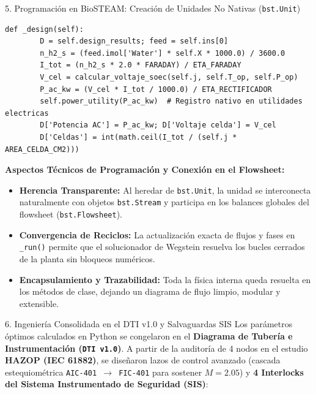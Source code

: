 \documentclass[12pt]{article}
\begin{document}
\begin{minipage}[t]{0.49\linewidth}
\begin{posterbox}[secondaryblue]{5. Programación en BioSTEAM: Creación de Unidades No Nativas (\texttt{bst.Unit})}
\begin{lstlisting}[style=biosteamcode]
    def _design(self):
        D = self.design_results; feed = self.ins[0]
        n_h2_s = (feed.imol['Water'] * self.X * 1000.0) / 3600.0
        I_tot = (n_h2_s * 2.0 * FARADAY) / ETA_FARADAY
        V_cel = calcular_voltaje_soec(self.j, self.T_op, self.P_op)
        P_ac_kw = (V_cel * I_tot / 1000.0) / ETA_RECTIFICADOR
        self.power_utility(P_ac_kw)  # Registro nativo en utilidades electricas
        D['Potencia AC'] = P_ac_kw; D['Voltaje celda'] = V_cel
        D['Celdas'] = int(math.ceil(I_tot / (self.j * AREA_CELDA_CM2)))
\end{lstlisting}

        \vspace{6pt}
        \textbf{Aspectos Técnicos de Programación y Conexión en el Flowsheet:}
        \begin{itemize}[leftmargin=*, itemsep=2.5pt, topsep=2pt]
            \item \textbf{Herencia Transparente:} Al heredar de \texttt{bst.Unit}, la unidad se interconecta naturalmente con objetos \texttt{bst.Stream} y participa en los balances globales del flowsheet (\texttt{bst.Flowsheet}).
            \item \textbf{Convergencia de Reciclos:} La actualización exacta de flujos y fases en \texttt{\_run()} permite que el solucionador de Wegstein resuelva los bucles cerrados de la planta sin bloqueos numéricos.
            \item \textbf{Encapsulamiento y Trazabilidad:} Toda la física interna queda resuelta en los métodos de clase, dejando un diagrama de flujo limpio, modular y extensible.
        \end{itemize}
    \end{posterbox}

    \vspace{0.18cm}

    \begin{posterbox}[secondaryblue]{6. Ingeniería Consolidada en el DTI v1.0 y Salvaguardas SIS}
        \fontsize{14.5}{18.5}\selectfont
        Los parámetros óptimos calculados en Python se congelaron en el \textbf{Diagrama de Tubería e Instrumentación (\texttt{DTI v1.0})}. A partir de la auditoría de 4 nodos en el estudio \textbf{HAZOP (IEC 61882)}, se diseñaron lazos de control avanzado (cascada estequiométrica \texttt{AIC-401 $\to$ FIC-401} para sostener $M=2.05$) y \textbf{4 Interlocks del Sistema Instrumentado de Seguridad (SIS)}:


\end{posterbox}
\end{minipage}
\end{document}
